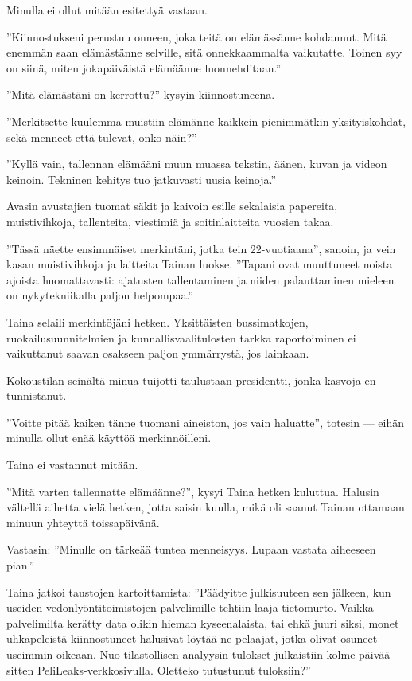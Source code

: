 ﻿\documentclass[a4paper, 12pt, finnish]{article}
\newcommand{\q}[1]{''#1''}
\begin{document}
Minulla ei ollut mitään esitettyä vastaan.

\q{Kiinnostukseni perustuu onneen, joka teitä on elämässänne kohdannut.
Mitä enemmän saan elämästänne selville, sitä onnekkaammalta vaikutatte.
Toinen syy on siinä, miten jokapäiväistä elämäänne luonnehditaan.}

\q{Mitä elämästäni on kerrottu?} kysyin kiinnostuneena.

\q{Merkitsette kuulemma muistiin elämänne kaikkein pienimmätkin
yksityiskohdat, sekä menneet että tulevat, onko näin?}

\q{Kyllä vain, tallennan elämääni muun muassa tekstin, äänen,
kuvan ja videon keinoin. Tekninen kehitys tuo jatkuvasti
uusia keinoja.}

Avasin avustajien tuomat säkit ja kaivoin esille sekalaisia
papereita, muistivihkoja, tallenteita, viestimiä
ja soitinlaitteita vuosien takaa.

\q{Tässä näette ensimmäiset merkintäni, jotka tein 22-vuotiaana},
sanoin, ja vein kasan muistivihkoja ja laitteita Tainan
luokse. \q{Tapani ovat muuttuneet noista ajoista huomattavasti:
ajatusten tallentaminen ja niiden palauttaminen mieleen on
nykytekniikalla paljon helpompaa.}

Taina selaili merkintöjäni hetken. Yksittäisten bussimatkojen,
ruokailusuunnitelmien ja kunnallisvaalitulosten tarkka raportoiminen
ei vaikuttanut saavan osakseen paljon ymmärrystä, jos lainkaan.

Kokoustilan seinältä minua tuijotti taulustaan presidentti,
jonka kasvoja en tunnistanut.

\q{Voitte pitää kaiken tänne
tuomani aineiston, jos vain haluatte}, totesin --- eihän minulla
ollut enää käyttöä merkinnöilleni.

Taina ei vastannut mitään.

\q{Mitä varten tallennatte elämäänne?}, kysyi Taina hetken kuluttua.
Halusin vältellä aihetta vielä hetken, jotta saisin kuulla,
mikä oli saanut Tainan ottamaan minuun yhteyttä
toissapäivänä.

Vastasin: \q{Minulle on tärkeää tuntea menneisyys.
Lupaan vastata aiheeseen pian.}

Taina jatkoi taustojen kartoittamista: \q{Päädyitte julkisuuteen
sen jälkeen, kun useiden vedonlyöntitoimistojen palvelimille
tehtiin laaja tietomurto. Vaikka palvelimilta kerätty data olikin
hieman kyseenalaista, tai ehkä juuri siksi, monet uhkapeleistä
kiinnostuneet halusivat löytää ne pelaajat, jotka olivat osuneet
useimmin oikeaan.
Nuo tilastollisen analyysin tulokset julkaistiin kolme päivää
sitten PeliLeaks-verkkosivulla. Oletteko tutustunut tuloksiin?}
\end{document}
